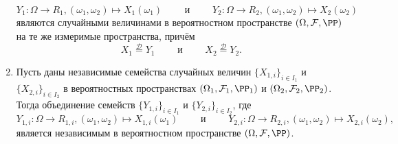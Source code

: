 \documentclass[12pt,a4paper]{article}
\newcommand{\Deq}{\mathrel{\stackrel{\mathcal{D}}{=}}}
\begin{document}
\begin{theorem}
\begin{enumerate}
                \[Y_1: \Omega \to R_1, (\omega_1, \omega_2) \mapsto X_1(\omega_1) \qquad \text{ и } \qquad Y_2: \Omega \to R_2, (\omega_1, \omega_2) \mapsto X_2(\omega_2)\]
                являются случайными величинами в вероятностном пространстве $(\Omega, \mathcal{F}, \PP)$ на те же измеримые пространства, причём
                \[X_1 \Deq Y_1 \qquad \text{ и } \qquad X_2 \Deq Y_2.\]
            \item Пусть даны независимые семейства случайных величин $\{X_{1,i}\}_{i \in I_1}$ и $\{X_{2, i}\}_{i \in I_2}$ в вероятностных пространствах $(\Omega_1, \mathcal{F}_1, \PP_1)$ и $(\Omega_2, \mathcal{F}_2, \PP_2)$. Тогда объединение семейств $\{Y_{1, i}\}_{i \in I_1}$ и $\{Y_{2, i}\}_{i \in I_2}$, где
                \[Y_{1, i}: \Omega \to R_{1, i}, (\omega_1, \omega_2) \mapsto X_{1, i}(\omega_1) \qquad \text{ и } \qquad Y_{2, i}: \Omega \to R_{2, i}, (\omega_1, \omega_2) \mapsto X_{2, i}(\omega_2),\]
                является независимым в вероятностном пространстве $(\Omega, \mathcal{F}, \PP)$.
        \end{enumerate}
    \end{theorem}
\end{document}
